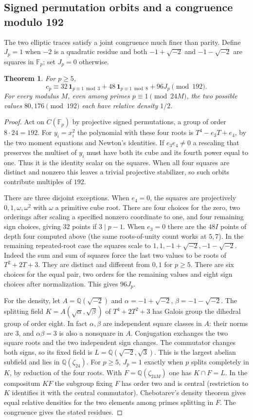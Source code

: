 \documentclass[11pt]{article}
\newtheorem{theorem}{Theorem}[section]
\newcommand{\F}{\mathbb F}\newcommand{\Q}{\mathbb Q}\newcommand{\PP}{\mathbb P}
\begin{document}
\subsection*{Signed permutation orbits and a congruence modulo 192}
The two elliptic traces satisfy a joint congruence much finer than
parity. Define $J_p=1$ when $-2$ is a quadratic residue and both
$-1+\sqrt{-2}$ and $-1-\sqrt{-2}$ are squares in $\F_p$; set
$J_p=0$ otherwise.
\begin{theorem}\label{th:192}
For $p\ge5$,
\[
 c_p\equiv 32\,\mathbf1_{p\equiv1\bmod3}
       +48\,\mathbf1_{p\equiv1\bmod8}+96J_p\pmod{192}.
\]
For every modulus $M$, even among primes $p\equiv1\pmod{24M}$,
the two possible values $80,176\pmod{192}$ each have relative
density $1/2$.
\end{theorem}
\begin{proof}
Act on $C(\F_p)$ by projective signed permutations, a group of
order $8\cdot24=192$. For $y_i=x_i^2$ the polynomial with these
four roots is $T^4-e_3T+e_4$, by the two moment equations and
Newton's identities. If $e_3e_4\ne0$ a rescaling that preserves
the multiset of $y_i$ must have both its cube and its fourth power
equal to one. Thus it is the identity scalar on the squares.
When all four squares are distinct and nonzero this leaves a
trivial projective stabilizer, so such orbits contribute multiples
of $192$.

There are three disjoint exceptions. When $e_4=0$, the squares
are projectively $0,1,\omega,\omega^2$ with $\omega$ a primitive
cube root. There are four choices for the zero, two orderings
after scaling a specified nonzero coordinate to one, and four
remaining sign choices, giving $32$ points if $3\mid p-1$.
When $e_3=0$ there are the $48I$ points of depth four computed
above (the same roots-of-unity count works at $5,7$).
In the remaining repeated-root case the squares scale to
$1,1,-1+\sqrt{-2},-1-\sqrt{-2}$. Indeed the sum and sum of squares
force the last two values to be roots of $T^2+2T+3$. They are
distinct and different from $0,1$ for $p\ge5$. There are six
choices for the equal pair, two orders for the remaining values
and eight sign choices after normalization. This gives $96J_p$.

For the density, let $A=\Q(\sqrt{-2})$ and
$\alpha=-1+\sqrt{-2}$, $\beta=-1-\sqrt{-2}$. The splitting field
$K=A(\sqrt\alpha,\sqrt\beta)$ of $T^4+2T^2+3$ has Galois group
the dihedral group of order eight. In fact $\alpha,\beta$ are
independent square classes in $A$: their norms are $3$, and
$\alpha\beta=3$ is also a nonsquare in $A$. Conjugation exchanges
the two square roots and the two independent sign changes.
The commutator changes both signs, so its fixed field is
$L=\Q(\sqrt{-2},\sqrt3)$. This is the largest abelian subfield and
lies in $\Q(\zeta_{24})$. For $p\ge5$, $J_p=1$ exactly when $p$
splits completely in $K$, by reduction of the four roots. With
$F=\Q(\zeta_{24M})$ one has $K\cap F=L$. In the compositum $KF$
the subgroup fixing $F$ has order two and is central (restriction
to $K$ identifies it with the central commutator). Chebotarev's
density theorem gives equal relative densities for the two elements
among primes splitting in $F$. The congruence gives the stated
residues.
\end{proof}
\end{document}

